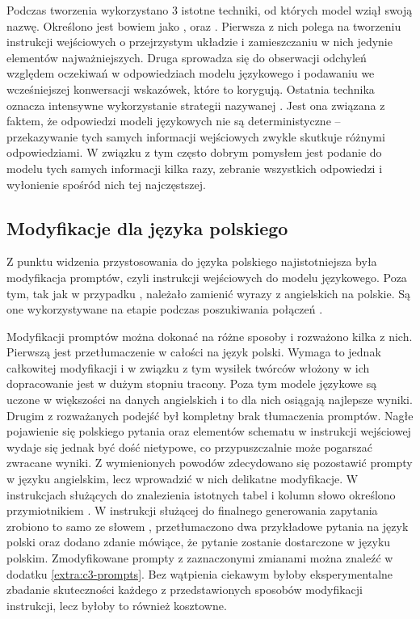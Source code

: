 Podczas tworzenia  wykorzystano 3 istotne techniki, od których model wziął swoją nazwę. Określono jest bowiem jako ,  oraz . Pierwsza z nich polega na tworzeniu instrukcji wejściowych o przejrzystym układzie i zamieszczaniu w nich jedynie elementów najważniejszych. Druga sprowadza się do obserwacji odchyleń względem oczekiwań w odpowiedziach modelu językowego i podawaniu we wcześniejszej konwersacji wskazówek, które to korygują. Ostatnia technika oznacza intensywne wykorzystanie strategii nazywanej  . Jest ona związana z faktem, że odpowiedzi modeli językowych nie są deterministyczne -- przekazywanie tych samych informacji wejściowych zwykle skutkuje różnymi odpowiedziami. W związku z tym często dobrym pomysłem jest podanie do modelu tych samych informacji kilka razy, zebranie wszystkich odpowiedzi i wyłonienie spośród nich tej najczęstszej.

\subsection{Modyfikacje dla języka polskiego}
Z punktu widzenia przystosowania  do języka polskiego najistotniejsza była modyfikacja promptów, czyli instrukcji wejściowych do modelu językowego. Poza tym, tak jak w przypadku , należało zamienić wyrazy  z angielskich na polskie. Są one wykorzystywane na etapie  podczas poszukiwania połączeń .

Modyfikacji promptów można dokonać na różne sposoby i rozważono kilka z nich. Pierwszą jest przetłumaczenie w całości na język polski. Wymaga to jednak całkowitej modyfikacji i w związku z tym wysiłek twórców  włożony w ich dopracowanie jest w dużym stopniu tracony. Poza tym modele językowe są uczone w większości na danych angielskich i to dla nich osiągają najlepsze wyniki. Drugim z rozważanych podejść był kompletny brak tłumaczenia promptów. Nagłe pojawienie się polskiego pytania oraz elementów schematu w instrukcji wejściowej wydaje się jednak być dość nietypowe, co przypuszczalnie może pogarszać zwracane wyniki. Z wymienionych powodów zdecydowano się pozostawić prompty w języku angielskim, lecz wprowadzić w nich delikatne modyfikacje. W instrukcjach służących do znalezienia istotnych tabel i kolumn słowo  określono przymiotnikiem . W instrukcji służącej do finalnego generowania zapytania zrobiono to samo ze słowem , przetłumaczono dwa przykładowe pytania na język polski oraz dodano zdanie mówiące, że pytanie zostanie dostarczone w języku polskim. Zmodyfikowane prompty z zaznaczonymi zmianami można znaleźć w dodatku \ref{extra:c3-prompts}. Bez wątpienia ciekawym byłoby eksperymentalne zbadanie skuteczności każdego z przedstawionych sposobów modyfikacji instrukcji, lecz byłoby to również kosztowne.

